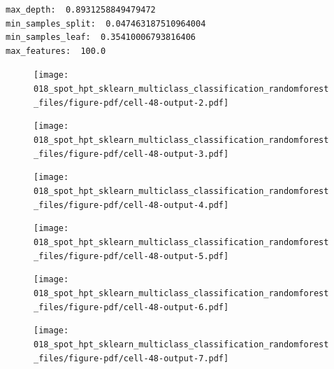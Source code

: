 \documentclass[
  letterpaper,
  DIV=11,
  numbers=noendperiod]{scrreprt}
\begin{document}
\begin{verbatim}
max_depth:  0.8931258849479472
min_samples_split:  0.047463187510964004
min_samples_leaf:  0.35410006793816406
max_features:  100.0
\end{verbatim}

\begin{figure}[H]

{\centering \texttt{[image: 018\_spot\_hpt\_sklearn\_multiclass\_classification\_randomforest\_files/figure-pdf/cell-48-output-2.pdf]}

}

\end{figure}

\begin{figure}[H]

{\centering \texttt{[image: 018\_spot\_hpt\_sklearn\_multiclass\_classification\_randomforest\_files/figure-pdf/cell-48-output-3.pdf]}

}

\end{figure}

\begin{figure}[H]

{\centering \texttt{[image: 018\_spot\_hpt\_sklearn\_multiclass\_classification\_randomforest\_files/figure-pdf/cell-48-output-4.pdf]}

}

\end{figure}

\begin{figure}[H]

{\centering \texttt{[image: 018\_spot\_hpt\_sklearn\_multiclass\_classification\_randomforest\_files/figure-pdf/cell-48-output-5.pdf]}

}

\end{figure}

\begin{figure}[H]

{\centering \texttt{[image: 018\_spot\_hpt\_sklearn\_multiclass\_classification\_randomforest\_files/figure-pdf/cell-48-output-6.pdf]}

}

\end{figure}

\begin{figure}[H]

{\centering \texttt{[image: 018\_spot\_hpt\_sklearn\_multiclass\_classification\_randomforest\_files/figure-pdf/cell-48-output-7.pdf]}

}

\end{figure}
\end{document}
